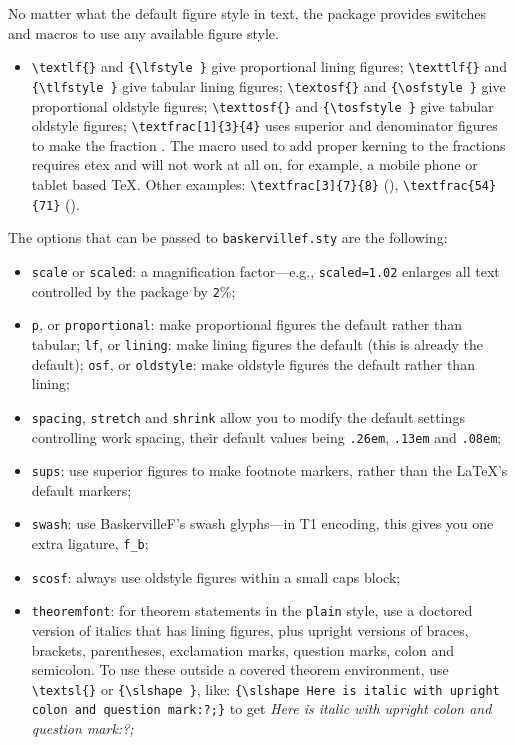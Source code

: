 \documentclass[11pt]{article}
\begin{document}
No matter what the default figure style in text, the package provides switches and macros to use any available figure style.
\begin{itemize}
\item
\verb|\textlf{}| and \verb|{\lfstyle }| give proportional lining figures;
\verb|\texttlf{}| and \verb|{\tlfstyle }| give tabular lining figures;
\verb|\textosf{}| and \verb|{\osfstyle }| give proportional oldstyle figures;
\verb|\texttosf{}| and \verb|{\tosfstyle }| give tabular oldstyle figures;
\verb|\textfrac[1]{3}{4}| uses superior and denominator figures to make the fraction . The macro used to add proper kerning to the fractions requires etex and will not work at all on, for example, a mobile phone or tablet based \TeX. Other examples: \verb|\textfrac[3]{7}{8}| (), \verb|\textfrac{54}{71}| ().
\end{itemize}
The options that can be passed to {\tt baskervillef.sty} are the following:
\begin{itemize}
\item {\tt scale} or {\tt scaled}: a magnification factor---e.g., {\tt scaled=1.02} enlarges all text controlled by the package by {\tt2}\%;
\item
{\tt p}, or {\tt proportional}: make proportional figures the default rather than tabular;
{\tt lf}, or {\tt lining}: make lining figures the default (this is already the default);
{\tt osf}, or {\tt oldstyle}: make oldstyle figures the default rather than lining;
\item {\tt spacing}, {\tt stretch} and {\tt shrink} allow you to modify the default  settings controlling work spacing, their default values being {\tt.26em}, {\tt.13em} and {\tt.08em};
\item {\tt sups}: use superior figures to make footnote markers, rather than the \LaTeX's default markers;
\item {\tt swash}: use BaskervilleF's swash glyphs---in T1 encoding, this gives you one extra ligature, \verb|f_b|;
\item {\tt scosf}: always use oldstyle figures within a small caps block;
\item {\tt theoremfont}: for theorem statements in the {\tt plain} style, use a doctored version of italics that has lining figures, plus upright versions of braces, brackets, parentheses, exclamation marks, question marks, colon and semicolon. To use these outside a covered theorem environment, use \verb|\textsl{}| or \verb|{\slshape }|, like: \verb|{\slshape Here is italic with upright colon and question mark:?;}|
to get {\slshape Here is italic with upright colon and question mark:?;}
\end{itemize}
\end{document}

